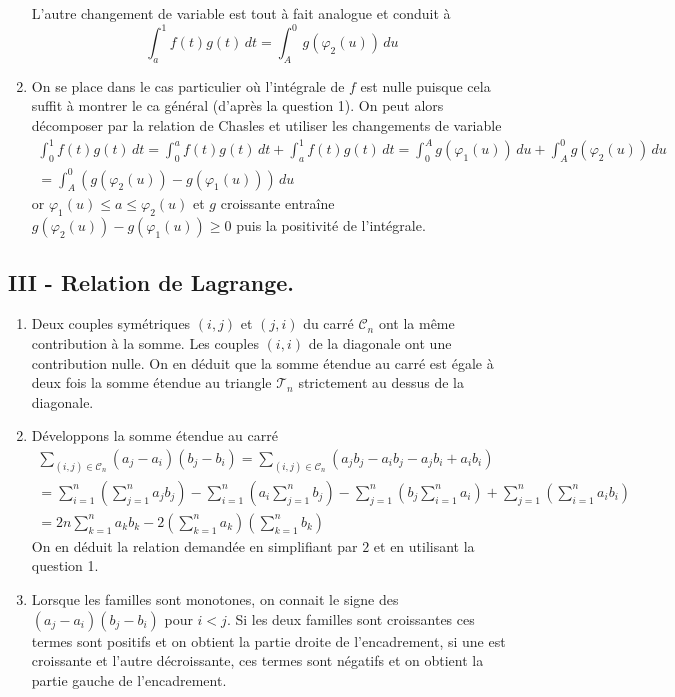 \begin{enumerate}
\begin{enumerate}
\end{enumerate}
L'autre changement de variable est tout à fait analogue et conduit à
\begin{displaymath}
 \int_a^1f(t)g(t)\,dt = \int_{A}^{0}g(\varphi_2(u))\,du
\end{displaymath}
 \item On se place dans le cas particulier où l'intégrale de $f$ est nulle puisque cela suffit à montrer le ca général (d'après la question 1). On peut alors décomposer par la relation de Chasles et utiliser les changements de variable
\begin{multline*}
 \int_0^1f(t)g(t)\,dt
= \int_0^af(t)g(t)\,dt + \int_a^1f(t)g(t)\,dt
= \int_{0}^{A}g(\varphi_1(u))\,du + \int_{A}^{0}g(\varphi_2(u))\,du\\
= \int_{A}^{0}\left( g(\varphi_2(u))- g(\varphi_1(u))\right) \,du
\end{multline*}
or $\varphi_1(u) \leq a \leq \varphi_2(u)$ et $g$ croissante entraîne $g(\varphi_2(u))- g(\varphi_1(u))\geq 0$ puis la positivité de l'intégrale.
\end{enumerate}

\subsection*{III - Relation de Lagrange.}
\begin{enumerate}
 \item Deux couples symétriques $(i,j)$ et $(j,i)$ du carré $\mathcal{C}_n$ ont la même contribution à la somme. Les couples $(i,i)$ de la diagonale ont une contribution nulle. On en déduit que la somme étendue au carré est égale à deux fois la somme étendue au triangle $\mathcal{T}_n$ strictement au dessus de la diagonale.  
 \item Développons la somme étendue au carré
\begin{multline*}
 \sum_{(i,j)\in \mathcal{C}_n}(a_j-a_i)(b_j-b_i)
= \sum_{(i,j)\in \mathcal{C}_n}(a_jb_j -a_ib_j  -a_jb_i + a_ib_i)\\
= \sum_{i=1}^n\left( \sum_{j=1}^na_jb_j\right) 
- \sum_{i=1}^n \left(a_i \sum_{j=1}^nb_j\right) 
- \sum_{j=1}^n \left(b_j \sum_{i=1}^na_i\right)
+\sum_{j=1}^n \left(\sum_{i=1}^na_ib_i\right) \\
= 2n \sum_{k=1}^n a_kb_k - 2\left(\sum_{k=1}^n a_k \right)\left(\sum_{k=1}^n b_k \right) 
\end{multline*}
On en déduit la relation demandée en simplifiant par $2$ et en utilisant la question 1.
 \item Lorsque les familles sont monotones, on connait le signe des $(a_j-a_i)(b_j-b_i)$ pour $i<j$. Si les deux familles sont croissantes ces termes sont positifs et on obtient la partie droite de l'encadrement, si une est croissante et l'autre décroissante, ces termes sont négatifs et on obtient la partie gauche de l'encadrement.
\end{enumerate}
